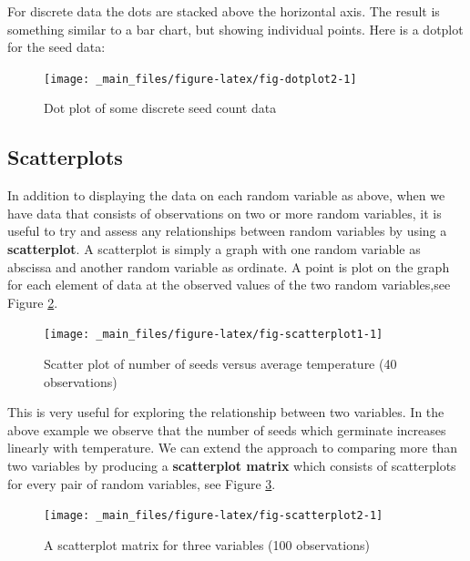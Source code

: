 \documentclass[
]{book}
\begin{document}
For discrete data the dots are stacked above the
horizontal axis. The result is something
similar to a bar chart, but showing individual points.
Here is a dotplot for the
seed data:

\begin{figure}

{\centering \texttt{[image: \_main\_files/figure-latex/fig-dotplot2-1]} 

}

\caption{Dot plot of some discrete seed count data}\label{fig:fig-dotplot2}
\end{figure}

\hypertarget{visual_plot_scatter}{%
\subsection{\texorpdfstring{{\textbf{Scatterplots}}}{Scatterplots}}\label{visual_plot_scatter}}

In addition to displaying the data on each random variable as above,
when we have data that consists of observations on two or more random
variables, it is useful to try and assess any relationships between
random variables by using a \textbf{scatterplot}. A scatterplot is simply a
graph with one random variable as abscissa and another random variable
as ordinate. A point is plot on the graph for each element of data at
the observed values of the two random variables,see Figure
\ref{fig:fig-scatterplot1}.

\begin{figure}

{\centering \texttt{[image: \_main\_files/figure-latex/fig-scatterplot1-1]} 

}

\caption{Scatter plot of number of seeds versus average temperature (40 observations)}\label{fig:fig-scatterplot1}
\end{figure}

This is very useful for exploring the relationship between two variables. In the above example we observe that the number of seeds which germinate increases linearly with temperature. We can extend the approach to comparing more than two variables by producing
a \textbf{scatterplot matrix}
which consists of scatterplots for every pair of random variables, see
Figure \ref{fig:fig-scatterplot2}.

\begin{figure}

{\centering \texttt{[image: \_main\_files/figure-latex/fig-scatterplot2-1]} 

}

\caption{A scatterplot matrix for three variables (100 observations)}\label{fig:fig-scatterplot2}
\end{figure}
\end{document}
